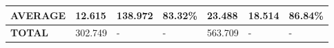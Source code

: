 \begin{table}[pt]
{\begin{tabular}{|l|l|l|l|l|l|l|}
    \hline
    \textbf{AVERAGE}                                                                                                   & 12.615                                                                                          & 138.972                           & 83.32\%                           & 23.488                                                                                                            & 18.514                            & 86.84\%                            \\ 
    \hline
    \textbf{TOTAL}                                                                                                       & 302.749                                                                                         & -                                 & -                                 & 563.709                                                                                                           & -                                 & -                                  \\
    \hline
    \end{tabular}}
  \label{table:pendeteksianberdasarkanwaktusiang}
\end{table}

